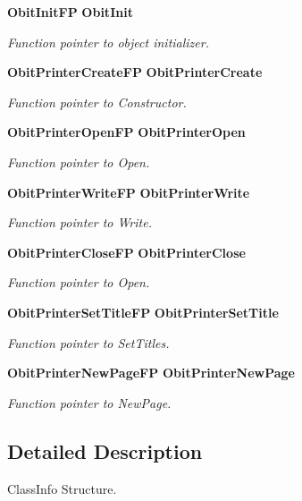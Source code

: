 \begin{CompactItemize}
{\bf Obit\-Init\-FP} {\bf Obit\-Init}
\begin{CompactList}\small\item\em Function pointer to object initializer. \item\end{CompactList}\item 
{\bf Obit\-Printer\-Create\-FP} {\bf Obit\-Printer\-Create}
\begin{CompactList}\small\item\em Function pointer to Constructor. \item\end{CompactList}\item 
{\bf Obit\-Printer\-Open\-FP} {\bf Obit\-Printer\-Open}
\begin{CompactList}\small\item\em Function pointer to Open. \item\end{CompactList}\item 
{\bf Obit\-Printer\-Write\-FP} {\bf Obit\-Printer\-Write}
\begin{CompactList}\small\item\em Function pointer to Write. \item\end{CompactList}\item 
{\bf Obit\-Printer\-Close\-FP} {\bf Obit\-Printer\-Close}
\begin{CompactList}\small\item\em Function pointer to Open. \item\end{CompactList}\item 
{\bf Obit\-Printer\-Set\-Title\-FP} {\bf Obit\-Printer\-Set\-Title}
\begin{CompactList}\small\item\em Function pointer to Set\-Titles. \item\end{CompactList}\item 
{\bf Obit\-Printer\-New\-Page\-FP} {\bf Obit\-Printer\-New\-Page}
\begin{CompactList}\small\item\em Function pointer to New\-Page. \item\end{CompactList}\end{CompactItemize}


\subsection{Detailed Description}
Class\-Info Structure. 

